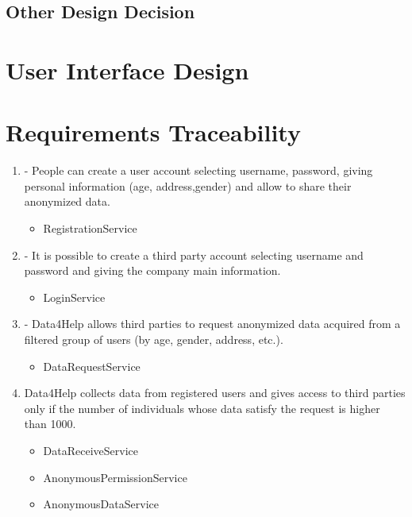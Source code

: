 \documentclass[a4paper]{article}
\begin{document}
\subsection{Other Design Decision}

\section{User Interface Design}

\section{Requirements Traceability}

\begin{enumerate}[label*=\bf{R.\arabic*}]

\item - People can create a user account selecting username, password,
giving personal information (age, address,gender) and allow to
share their anonymized data.

\begin{itemize}
\item RegistrationService
\end{itemize}

\item - It is possible to create a third party account selecting username
and password and giving the company main information.

\begin{itemize}
\item LoginService
\end{itemize}

\item - Data4Help allows third parties to request anonymized data acquired
from a filtered group of users (by age, gender, address, etc.).

\begin{itemize}
\item DataRequestService
\end{itemize}

\item Data4Help collects data from registered users and gives access to
third parties only if the number of individuals whose data satisfy the
request is higher than 1000.

\begin{itemize}
\item DataReceiveService
\item AnonymousPermissionService
\item AnonymousDataService
\end{itemize}


\end{enumerate}
\end{document}
